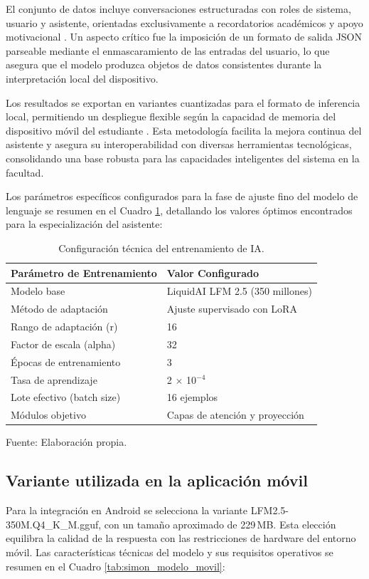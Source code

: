 El conjunto de datos incluye conversaciones estructuradas con roles de sistema, usuario y asistente, orientadas exclusivamente a recordatorios académicos y apoyo motivacional \cite{simon_dataset}. Un aspecto crítico fue la imposición de un formato de salida JSON parseable mediante el enmascaramiento de las entradas del usuario, lo que asegura que el modelo produzca objetos de datos consistentes durante la interpretación local del dispositivo.

Los resultados se exportan en variantes cuantizadas para el formato de inferencia local, permitiendo un despliegue flexible según la capacidad de memoria del dispositivo móvil del estudiante \cite{simon_model}. Esta metodología facilita la mejora continua del asistente y asegura su interoperabilidad con diversas herramientas tecnológicas, consolidando una base robusta para las capacidades inteligentes del sistema en la facultad.

Los parámetros específicos configurados para la fase de ajuste fino del modelo de lenguaje se resumen en el Cuadro \ref{tab:f7_entrenamiento_ia}, detallando los valores óptimos encontrados para la especialización del asistente:

\begin{table}[H]
\centering
\renewcommand{\arraystretch}{1.2}
\begin{tabularx}{\linewidth}{@{}>{\RaggedRight\arraybackslash}p{4cm}X@{}}
\toprule
Parámetro de Entrenamiento & Valor Configurado \\
\midrule
Modelo base & LiquidAI LFM 2.5 (350 millones) \\
Método de adaptación & Ajuste supervisado con LoRA \\
Rango de adaptación (r) & 16 \\
Factor de escala (alpha) & 32 \\
Épocas de entrenamiento & 3 \\
Tasa de aprendizaje & 2 $\times$ 10$^{-4}$ \\
Lote efectivo (batch size) & 16 ejemplos \\
Módulos objetivo & Capas de atención y proyección \\
\bottomrule
\end{tabularx}
\caption{Configuración técnica del entrenamiento de IA.}\label{tab:f7_entrenamiento_ia}
Fuente: Elaboración propia.
\end{table}

\subsection{Variante utilizada en la aplicación móvil}
Para la integración en Android se selecciona la variante LFM2.5-350M.Q4\_K\_M.gguf, con un tamaño aproximado de 229\,MB. Esta elección equilibra la calidad de la respuesta con las restricciones de hardware del entorno móvil. Las características técnicas del modelo y sus requisitos operativos se resumen en el Cuadro \ref{tab:simon_modelo_movil}:

